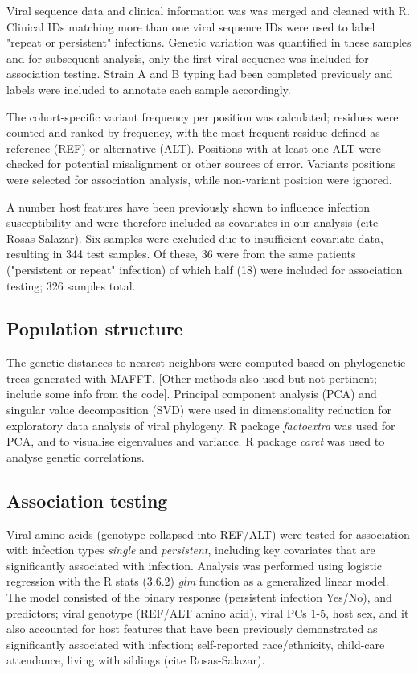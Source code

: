 \documentclass{article}
\begin{document}
Viral sequence data and clinical information was was merged and cleaned with R.
Clinical IDs matching more than one viral sequence IDs were used to label "repeat or persistent" infections. 
Genetic variation was quantified in these samples and for subsequent analysis, only the first viral sequence was included for association testing. 
Strain A and B typing had been completed previously and labels were included to annotate each sample accordingly.

The cohort-specific variant frequency per position was calculated;
residues were counted and ranked by frequency,
with the most frequent residue defined as reference (REF) or alternative (ALT).
Positions with at least one ALT were checked for potential misalignment or other sources of error. 
Variants positions were selected for association analysis, while non-variant position were ignored.

A number host features have been previously shown to influence infection susceptibility and were therefore included as covariates in our analysis (cite Rosas-Salazar).
Six samples were excluded due to insufficient covariate data, resulting in 344 test samples. 
Of these, 36 were from the same patients ("persistent or repeat" infection) of which half (18) were included for association testing; 326 samples total.


\subsection{Population structure}
The genetic distances to nearest neighbors were computed based on phylogenetic 
trees generated with MAFFT.
[Other methods also used but not pertinent; include some info from the code].
Principal component analysis (PCA) and singular value decomposition (SVD) were used in dimensionality reduction for exploratory data analysis of viral phylogeny.
R package \textit{factoextra} was used for PCA, and to visualise eigenvalues and variance. 
R package \textit{caret} was used to analyse genetic correlations.

\subsection{Association testing}
Viral amino acids (genotype collapsed into REF/ALT) were tested for association with infection types \textit{single} and \textit{persistent}, 
including key covariates that are significantly associated with infection.
Analysis was performed using logistic regression with the
R stats (3.6.2) \textit{glm} function as a generalized linear model.
The model consisted of the binary response (persistent infection Yes/No), and predictors; viral genotype (REF/ALT amino acid), viral PCs 1-5, host sex, and it also accounted for host features that have been previously demonstrated as significantly associated with infection; 
self-reported race/ethnicity, child-care attendance, living with siblings (cite Rosas-Salazar).
\end{document}
